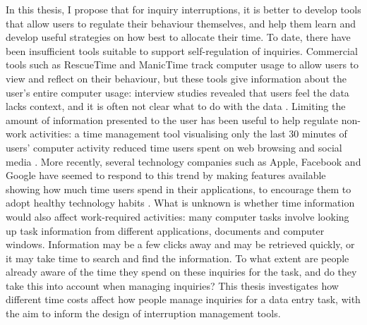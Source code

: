 In this thesis, I propose that for inquiry interruptions, it is better to develop tools that allow users to regulate their behaviour themselves, and help them learn and develop useful strategies on how best to allocate their time. To date, there have been insufficient tools suitable to support self-regulation of inquiries. Commercial tools such as RescueTime \citep{RescueTime} and ManicTime \citep{ManicTime} track computer usage to allow users to view and reflect on their behaviour, but these tools give information about the user’s entire computer usage: interview studies revealed that users feel the data lacks context, and it is often not clear what to do with the data \citep{Collins2014}. Limiting the amount of information presented to the user has been useful to help regulate non-work activities: a time management tool visualising only the last 30 minutes of users' computer activity reduced time users spent on web browsing and social media \citep{Whittaker2016}. More recently, several technology companies such as Apple, Facebook and Google have seemed to respond to this trend by making features available showing how much time users spend in their applications, to encourage them to adopt healthy technology habits \citep{Apple2018, Constine2018, Constine2018a, Lynley2018}. What is unknown is whether time information would also affect work-required activities: many computer tasks involve looking up task information from different applications, documents and computer windows. Information may be a few clicks away and may be retrieved quickly, or it may take time to search and find the information. To what extent are people already aware of the time they spend on these inquiries for the task, and do they take this into account when managing inquiries? This thesis investigates how different time costs affect how people manage inquiries for a data entry task, with the aim to inform the design of interruption management tools.




